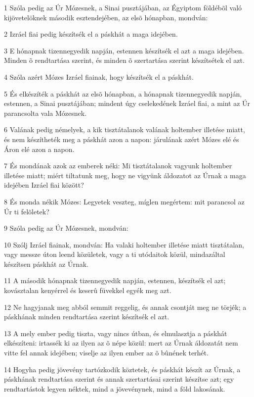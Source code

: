\par 1 Szóla pedig az Úr Mózesnek, a Sinai pusztájában, az Égyiptom földébõl való kijövetelöknek második esztendejében, az elsõ hónapban, mondván:
\par 2 Izráel fiai pedig készítsék el a páskhát a maga idejében.
\par 3 E hónapnak tizennegyedik napján, estennen készítsék el azt a maga idejében. Minden õ rendtartása szerint, és minden õ szertartása szerint készítsétek el azt.
\par 4 Szóla azért Mózes Izráel fiainak, hogy készítsék el a páskhát.
\par 5 És elkészíték a páskhát az elsõ hónapban, a hónapnak tizennegyedik napján, estennen, a Sinai pusztájában; mindent úgy cselekedének Izráel fiai, a mint az Úr parancsolta vala Mózesnek.
\par 6 Valának pedig némelyek, a kik tisztátalanok valának holtember illetése miatt, és nem készítheték meg a páskhát azon a napon: járulának azért Mózes elé és Áron elé azon a napon.
\par 7 És mondának azok az emberek néki: Mi tisztátalanok vagyunk holtember illetése miatt; miért tiltatunk meg, hogy ne vigyünk áldozatot az Úrnak a maga idejében Izráel fiai között?
\par 8 És monda nékik Mózes: Legyetek veszteg, míglen megértem: mit parancsol az Úr ti felõletek?
\par 9 Szóla pedig az Úr Mózesnek, mondván:
\par 10 Szólj Izráel fiainak, mondván: Ha valaki holtember illetése miatt tisztátalan, vagy messze úton leend közületek, vagy a ti utódaitok közül, mindazáltal készítsen páskhát az Úrnak.
\par 11 A második hónapnak tizennegyedik napján, estennen, készítsék el azt; kovásztalan kenyérrel és keserû füvekkel egyék meg azt.
\par 12 Ne hagyjanak meg abból semmit reggelig, és annak csontját meg ne törjék; a páskhának minden rendtartása szerint készítsék el azt.
\par 13 A mely ember pedig tiszta, vagy nincs útban, és elmulasztja a páskhát elkészíteni: irtassék ki az ilyen az õ népe közül: mert az Úrnak áldozatát nem vitte fel annak idejében; viselje az ilyen ember az õ bûnének terhét.
\par 14 Hogyha pedig jövevény tartózkodik köztetek, és páskhát készít az Úrnak, a páskhának rendtartása szerint és annak szertartásai szerint készítse azt; egy rendtartástok legyen néktek, mind a jövevénynek, mind a föld lakosának.
